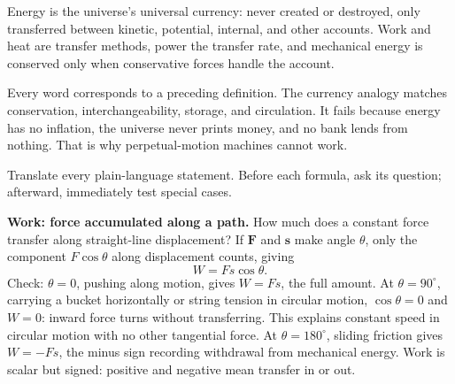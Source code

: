 
\begin{oneline}
Energy is the universe's universal currency: never created or destroyed, only transferred between kinetic, potential, internal, and other accounts. Work and heat are transfer methods, power the transfer rate, and mechanical energy is conserved only when conservative forces handle the account.
\end{oneline}

Every word corresponds to a preceding definition. The currency analogy matches conservation, interchangeability, storage, and circulation. It fails because energy has no inflation, the universe never prints money, and no bank lends from nothing. That is why perpetual-motion machines cannot work.


Translate every plain-language statement. Before each formula, ask its question; afterward, immediately test special cases.

\textbf{Work: force accumulated along a path.} How much does a constant force transfer along straight-line displacement? If \(\mathbf F\) and \(\mathbf s\) make angle \(\theta\), only the component \(F\cos\theta\) along displacement counts, giving
\[
W = Fs\cos\theta .
\]
Check: \(\theta=0\), pushing along motion, gives \(W=Fs\), the full amount. At \(\theta=90^{\circ}\), carrying a bucket horizontally or string tension in circular motion, \(\cos\theta=0\) and \(W=0\): inward force turns without transferring. This explains constant speed in circular motion with no other tangential force. At \(\theta=180^{\circ}\), sliding friction gives \(W=-Fs\), the minus sign recording withdrawal from mechanical energy. Work is scalar but signed: positive and negative mean transfer in or out.

\begin{center}
\end{center}

